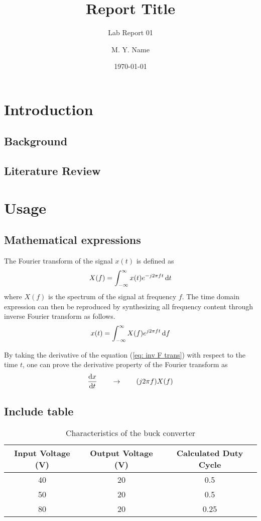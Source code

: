 \documentclass[]{zjureport}
\title{Report Title}
\author{M. Y. Name}
\subtitle{Lab Report 01}
\date{\today}
\begin{document}
    \maketitle
    \tocpage

\section{Introduction}
    \blindtext[1]
    \subsection{Background}
    \blindtext[2]
    \subsection{Literature Review}
    \blindtext[2]

\section{Usage}
\blindtext[1]
\subsection{Mathematical expressions}
The Fourier transform of the signal $x(t)$ is defined as 
\begin{equation}
    X(f)=\int_{-\infty}^{\infty} x(t) e^{-j2\pi ft} \, \mathrm{d}t
    \label{eq: F trans}
\end{equation}
where $X(f)$ is the spectrum of the signal at frequency $f$. The time domain expression can then be reproduced by synthesizing all frequency content through inverse Fourier transform as follows.
\begin{equation}
    x(t)=\int_{-\infty}^{\infty} X(f) e^{j2\pi ft} \, \mathrm{d}f
    \label{eq: inv F trans}
\end{equation}

By taking the derivative of the equation (\ref{eq: inv F trans}) with respect to the time $t$, one can prove the derivative property of the Fourier transform as
\begin{equation}
    \frac{\mathrm{d}x}{\mathrm{d}t} \qquad \to \qquad (j2\pi f) X(f)
    \label{eq: deriv.}
\end{equation}

\subsection{Include table}
\blindtext[1]
\begin{table}[H]
    \caption{Characteristics of the buck converter}
    \label{tab: Data}
    \centering
    \begin{tabular}{c|c|c}
    \toprule
     \bf{Input Voltage (V)}& \bf{Output Voltage (V)} & \textbf{Calculated Duty Cycle} \\
     \midrule
     40 & 20 & 0.5\\
     50 & 20 & 0.5 \\
     80 & 20 & 0.25 \\
     \bottomrule
    \end{tabular}
\end{table}
\end{document}
